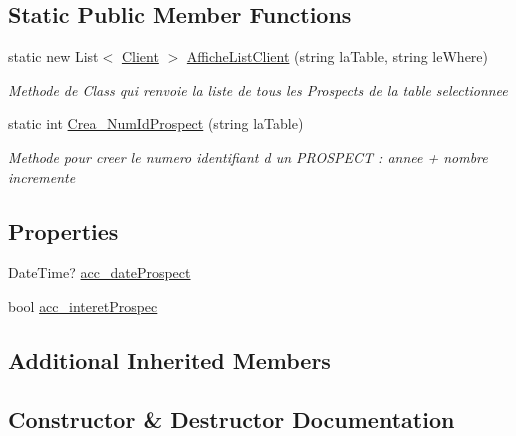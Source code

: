 \subsection*{Static Public Member Functions}
\begin{DoxyCompactItemize}
\item 
static new List$<$ \mbox{\hyperlink{class_d_b___projet___active_1_1_client}{Client}} $>$ \mbox{\hyperlink{class_d_b___projet___active_1_1_prospect_af8f3cecf1bebd492ee02c3bfd92253bb}{Affiche\+List\+Client}} (string la\+Table, string le\+Where)
\begin{DoxyCompactList}\small\item\em Methode de Class qui renvoie la liste de tous les Prospects de la table selectionnee \end{DoxyCompactList}\item 
static int \mbox{\hyperlink{class_d_b___projet___active_1_1_prospect_aa2fe650d83b5a4db37cc8aa1d7e1983c}{Crea\+\_\+\+Num\+Id\+Prospect}} (string la\+Table)
\begin{DoxyCompactList}\small\item\em Methode pour creer le numero identifiant d un P\+R\+O\+S\+P\+E\+CT \+: annee + nombre incremente \end{DoxyCompactList}\end{DoxyCompactItemize}
\subsection*{Properties}
\begin{DoxyCompactItemize}
\item 
Date\+Time? \mbox{\hyperlink{class_d_b___projet___active_1_1_prospect_a4558265d0e4df86b8f599802e7dcc1ce}{acc\+\_\+date\+Prospect}}
\item 
bool \mbox{\hyperlink{class_d_b___projet___active_1_1_prospect_a3a23435f3c7cce13b839cdf71c96cb74}{acc\+\_\+interet\+Prospec}}
\end{DoxyCompactItemize}
\subsection*{Additional Inherited Members}


\subsection{Constructor \& Destructor Documentation}
\mbox{\label{class_d_b___projet___active_1_1_prospect_a25d0e27506b849aa57950ad509b6a10e}} 
